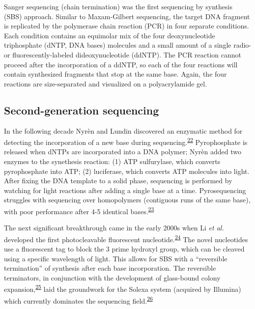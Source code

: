 \documentclass[11pt,letterpaper]{book}
\begin{document}
Sanger sequencing (chain termination) was the first sequencing by synthesis (SBS) approach.
Similar to Maxam-Gilbert sequencing, the target DNA fragment is replicated by the polymerase chain reaction (PCR) in four separate conditions.
Each condition contains an equimolar mix of the four deoxynucleotide triphosphate (dNTP, DNA bases) molecules and a small amount of a single radio- or fluorescently-labeled dideoxynucleotide (ddNTP).
The PCR reaction cannot proceed after the incorporation of a ddNTP, so each of the four reactions will contain synthesized fragments that stop at the same base.
Again, the four reactions are size-separated and visualized on a polyacrylamide gel.

\hypertarget{secGen}{%
\subsection{Second-generation sequencing}\label{secGen}}

In the following decade Nyrèn and Lundin discovered an enzymatic method for detecting the incorporation of a new base during sequencing.\textsuperscript{\protect\hyperlink{ref-nyren:1985aa}{22}}
Pyrophosphate is released when dNTPs are incorporated into a DNA polymer; Nyrèn added two enzymes to the synethesis reaction: (1) ATP sulfurylase, which converts pyrophosphate into ATP; (2) luciferase, which converts ATP molecules into light.
After fixing the DNA template to a solid phase, sequencing is performed by watching for light reactions after adding a single base at a time.
Pyrosequencing struggles with sequencing over homopolymers (contiguous runs of the same base), with poor performance after 4-5 identical bases.\textsuperscript{\protect\hyperlink{ref-ronaghi:1998aa}{23}}

The next significant breakthrough came in the early 2000s when Li \emph{et al.} developed the first photocleavable fluorescent nucleotide.\textsuperscript{\protect\hyperlink{ref-li:2003aa}{24}}
The novel nucleotides use a fluorescent tag to block the 3 prime hydroxyl group, which can be cleaved using a specific wavelength of light.
This allows for SBS with a ``reversible termination'' of synthesis after each base incorporation.
The reversible terminators, in conjunction with the development of glass-bound colony expansion,\textsuperscript{\protect\hyperlink{ref-fedurco:2006aa}{25}} laid the groundwork for the Solexa system (acquired by Illumina) which currently dominates the sequencing field.\textsuperscript{\protect\hyperlink{ref-turcatti:2008aa}{26}}
\end{document}
